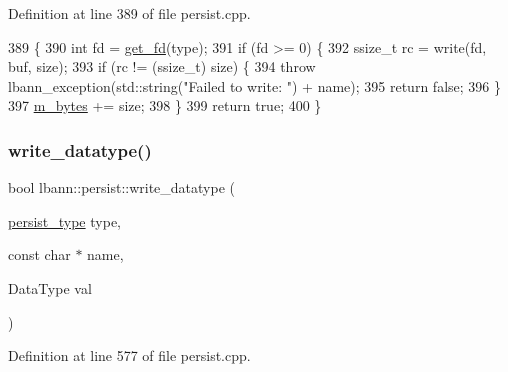 Definition at line 389 of file persist.\+cpp.


\begin{DoxyCode}
389                                                                                                 \{
390   \textcolor{keywordtype}{int} fd = \hyperlink{classlbann_1_1persist_a0fe7bbf6a5a47417aa904d0cb64af3fd}{get\_fd}(type);
391   \textcolor{keywordflow}{if} (fd >= 0) \{
392     ssize\_t rc = write(fd, buf, size);
393     \textcolor{keywordflow}{if} (rc != (ssize\_t) size) \{
394       \textcolor{keywordflow}{throw} lbann\_exception(std::string(\textcolor{stringliteral}{"Failed to write: "}) + name);
395       \textcolor{keywordflow}{return} \textcolor{keyword}{false};
396     \}
397     \hyperlink{classlbann_1_1persist_a0bd4fd42d9858a5210c8034dfbb666d4}{m\_bytes} += size;
398   \}
399   \textcolor{keywordflow}{return} \textcolor{keyword}{true};
400 \}
\end{DoxyCode}
\mbox{\label{classlbann_1_1persist_a5edc3f9cc3540b50d417993da2a6b5ce}} 
\subsubsection{\texorpdfstring{write\+\_\+datatype()}{write\_datatype()}}
{\footnotesize\ttfamily bool lbann\+::persist\+::write\+\_\+datatype (\begin{DoxyParamCaption}\item[{\hyperlink{namespacelbann_adee41f31f15f3906cbdcce4a1417eb56}{persist\+\_\+type}}]{type,  }\item[{const char $\ast$}]{name,  }\item[{Data\+Type}]{val }\end{DoxyParamCaption})}



Definition at line 577 of file persist.\+cpp.


